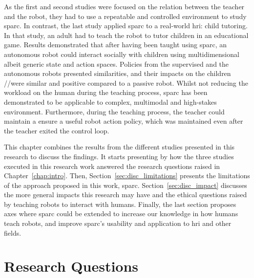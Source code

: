 As the first and second studies were focused on the relation between the teacher and the robot, they had to use a repeatable and controlled environment to study \gls{sparc}. In contrast, the last study applied \gls{sparc} to a real-world \gls{hri}: child tutoring. In that study, an adult had to teach the robot to tutor children in an educational game. Results demonstrated that after having been taught using \gls{sparc}, an autonomous robot could interact socially with children using multidimensional albeit generic state and action spaces. Policies from the supervised and the autonomous robots presented similarities, and their impacts on the children //were similar and positive compared to a passive robot. Whilst not reducing the workload on the human during the teaching process, \gls{sparc} has been demonstrated to be applicable to complex, multimodal and high-stakes environment. Furthermore, during the teaching process, the teacher could maintain a ensure a useful robot action policy, which was maintained even after the teacher exited the control loop.

This chapter combines the results from the different studies presented in this research to discuss the findings. It starts presenting by how the three studies executed in this research work answered the research questions raised in Chapter~\ref{chap:intro}. Then, Section~\ref{sec:disc_limitations} presents the limitations of the approach proposed in this work, \gls{sparc}. Section~\ref{sec:disc_impact} discusses the more general impacts this research may have and the ethical questions raised by teaching robots to interact with humans.
Finally, the last section proposes axes where \gls{sparc} could be extended to increase our knowledge in how humans teach robots, and improve \gls{sparc}'s usability and application to \gls{hri} and other fields.

\section{Research Questions} \label{sec:disc_rq}

